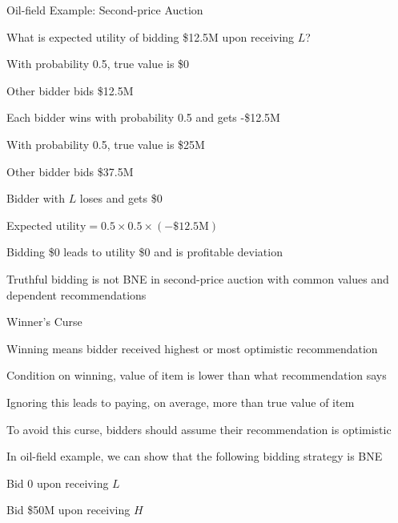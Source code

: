 \documentclass[11pt,aspectratio=169]{beamer}
\begin{document}
  
  \begin{frame}{Oil-field Example: Second-price Auction}
   \begin{itemize}[<+->]
   \setlength{\itemsep}{0.6em}
    \item What is expected utility of bidding \$12.5M upon receiving $L$?
    \begin{itemizes}[0.5em]
     \item With probability 0.5, true value is \$0
     \begin{itemizes}[0.4em]
      \item Other bidder bids \$12.5M
      \item Each bidder wins with probability 0.5 and gets -\$12.5M
     \end{itemizes}
     \item With probability 0.5, true value is \$25M
     \begin{itemizes}[0.4em]
      \item Other bidder bids \$37.5M
      \item Bidder with $L$ loses and gets \$0
     \end{itemizes}
     \item Expected $\text{utility} = 0.5 \times 0.5 \times (-\text{\$12.5M})$
    \end{itemizes}
    \item Bidding \$0 leads to utility \$0 and is \alert{profitable deviation}
    \item \alert{Truthful bidding is not BNE in second-price auction with common values and dependent recommendations}
   \end{itemize}
  \end{frame}
  
  
  \begin{frame}{Winner's Curse}
   \begin{itemizes}
    \item Winning means bidder received highest or \alert{most optimistic} recommendation
    \item Condition on winning, value of item is lower than what recommendation says
    \item Ignoring this leads to paying, on average, \alert{more than} true value of item
    \item To avoid this curse, bidders should assume their recommendation is optimistic
    \item In oil-field example, we can show that the following bidding strategy is BNE
    \begin{itemizes}
     \item Bid 0 upon receiving $L$
     \item Bid \$50M upon receiving $H$  
    \end{itemizes} 
   \end{itemizes}
  \end{frame}
  
\end{document}
